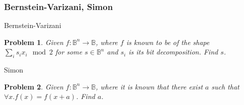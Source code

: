 \documentclass{beamer}
\newcommand{\Bool}{\ensuremath{\mathbb{B}}}
\newtheorem{prob}{Problem}
\begin{document}

\begin{frame}

\frametitle{Bernstein-Varizani, Simon}

Bernstein-Varizani
\begin{prob}
    Given $f : \Bool^n\rightarrow\Bool$, where $f$ is known to be
of the shape $\sum_i s_i x_i \mod 2$ for some $s\in\Bool^n$ and $s_i$ is its
bit decomposition. Find $s$.
\end{prob}

\pause

Simon
\begin{prob}
    Given $f : \Bool^n\rightarrow\Bool$, where it is known that
    there exist $a$ such that $\forall x. f(x) = f(x + a)$. Find $a$.
\end{prob}

\end{frame}

\end{document}
